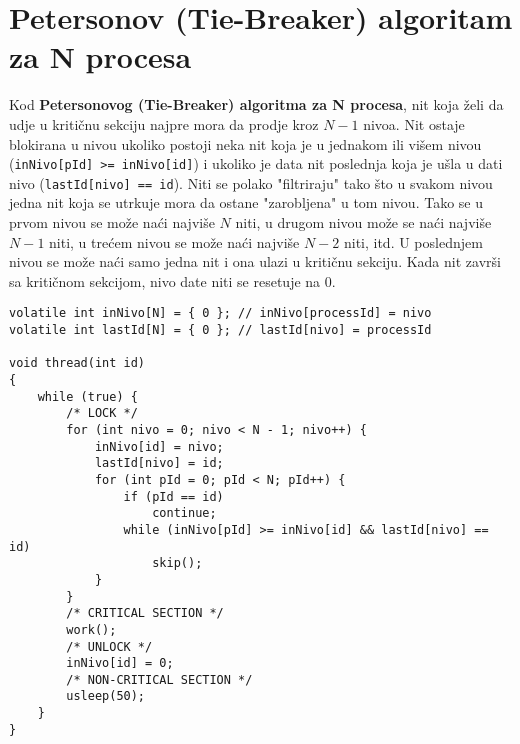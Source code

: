 \clearpage
\section{Petersonov (Tie-Breaker) algoritam za N procesa}
Kod \textbf{Petersonovog (Tie-Breaker) algoritma za N procesa}, nit koja \v{z}eli da udje u kriti\v{c}nu sekciju najpre mora da prodje kroz $N - 1$ nivoa. Nit ostaje blokirana u nivou ukoliko postoji neka nit koja je u jednakom ili vi\v{s}em nivou (\texttt{inNivo[pId] >= inNivo[id]}) i ukoliko je data nit poslednja koja je u\v{s}la u dati nivo (\texttt{lastId[nivo] == id}). Niti se polako "filtriraju" tako \v{s}to u svakom nivou jedna nit koja se utrkuje mora da ostane "zarobljena" u tom nivou. Tako se u prvom nivou se mo\v{z}e na\'{c}i najvi\v{s}e $N$ niti, u drugom nivou mo\v{z}e se na\'{c}i najvi\v{s}e $N-1$ niti, u tre\'{c}em nivou se mo\v{z}e na\'{c}i najvi\v{s}e $N-2$ niti, itd. U poslednjem nivou se mo\v{z}e na\'{c}i samo jedna nit i ona ulazi u kriti\v{c}nu sekciju. Kada nit zavr\v{s}i sa kriti\v{c}nom sekcijom, nivo date niti se resetuje na 0.
\begin{lstlisting}
volatile int inNivo[N] = { 0 }; // inNivo[processId] = nivo
volatile int lastId[N] = { 0 }; // lastId[nivo] = processId

void thread(int id)
{
    while (true) {
		/* LOCK */
        for (int nivo = 0; nivo < N - 1; nivo++) {
            inNivo[id] = nivo;
            lastId[nivo] = id;
            for (int pId = 0; pId < N; pId++) {
                if (pId == id)
                    continue;
                while (inNivo[pId] >= inNivo[id] && lastId[nivo] == id) 
                    skip();
            }
        }
		/* CRITICAL SECTION */
        work();
		/* UNLOCK */
        inNivo[id] = 0;
		/* NON-CRITICAL SECTION */
        usleep(50);
    }
}
\end{lstlisting}